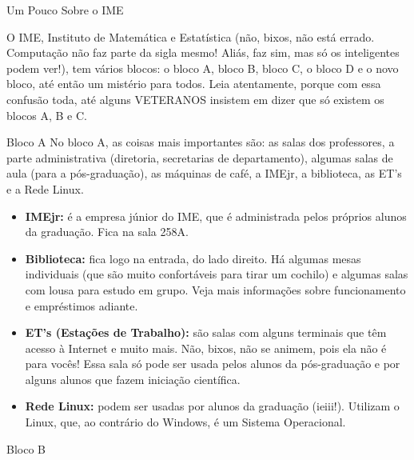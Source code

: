 \begin{secao}{Um Pouco Sobre o IME}

O IME, Instituto de Matemática e Estatística (não, bixos, não está errado. 
Computação não faz parte da sigla mesmo! Aliás, faz sim, mas só os inteligentes 
podem ver!), tem vários blocos: o bloco A, bloco B, bloco C, o bloco D e o 
novo bloco, até então um mistério para todos. Leia atentamente, porque com essa 
confusão toda, até alguns VETERANOS insistem em dizer que só existem os blocos
A, B e C.




\begin{subsecao}{Bloco A}
No bloco A, as coisas mais importantes são: as salas dos professores, a parte
administrativa (diretoria, secretarias de departamento), algumas salas de aula
(para a pós-graduação), as máquinas de café, a IMEjr, a biblioteca, as ET's e
a Rede Linux.

\begin{itemize}

\item {\bf IMEjr:} é a empresa júnior do IME, que é administrada pelos próprios
alunos da graduação. Fica na sala 258A.

\item {\bf Biblioteca:} fica logo na entrada, do lado direito. Há algumas mesas
individuais (que são muito confortáveis para tirar um cochilo) e algumas salas
com lousa para estudo em grupo. Veja mais informações sobre funcionamento e empréstimos adiante.

\item {\bf ET's (Estações de Trabalho):} são salas com alguns terminais que têm
acesso à Internet e muito mais. Não, bixos, não se animem, pois ela não é para
vocês! Essa sala só pode ser usada pelos alunos da pós-graduação e por alguns
alunos que fazem iniciação científica.

\item {\bf Rede Linux:} podem ser usadas por alunos da graduação (ieiii!).
Utilizam o Linux, que, ao contrário do Windows, é um Sistema Operacional.

\end{itemize}
\end{subsecao}

\begin{subsecao}{Bloco B}


\end{subsecao}
\end{secao}
